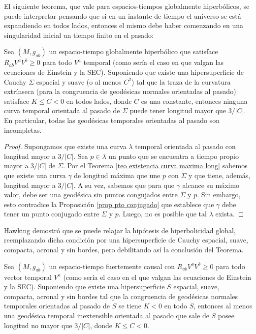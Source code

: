 El siguiente teorema, que vale para espacios-tiempos globalmente hiperbólicos, se puede interpretar pensando que si en un instante de tiempo el universo se está expandiendo en todos lados, entonces el mismo debe haber comenzando en una singularidad inicial un tiempo finito en el pasado:  

    
\begin{theorem}
Sea $(M,g_{ab})$ un espacio-tiempo globalmente hiperbólico que satisface $R_{ab}V^aV^b \geq 0$ para todo $V^a$ temporal (como sería el caso en que valgan las ecuaciones de Einstein y la SEC). Suponiendo que existe una hipersuperficie de Cauchy $\Sigma$ espacial y suave (o al menos $C^2$) tal que la traza de la curvatura extrínseca (para la congruencia de geodésicas normales orientadas al pasado) satisface $K\leq C < 0$ en todos lados, donde $C$ es una constante, entonces ninguna curva temporal orientada al pasado de $\Sigma$ puede tener longitud mayor que $3/|C|$. En particular, todas las geodésicas temporales orientadas al pasado son incompletas.
\end{theorem}
\begin{proof}
Supongamos que existe una curva $\lambda$ temporal orientada al pasado con longitud mayor a $3/|C|$. Sea $p\in\lambda$ un punto que se encuentra a tiempo propio mayor a $3/|C|$ de $\Sigma$. Por el Teorema \ref{teo existencia curva maxima long} sabemos que existe una curva $\gamma$ de longitud máxima que une $p$ con $\Sigma$ y que tiene, además, longitud mayor a $3/|C|$. A su vez, sabemos que para que $\gamma$ alcance su máximo valor, debe ser una geodésica sin puntos congujados entre $\Sigma$ y $p$. Sin embargo, esto contradice la Proposición \ref{prop pto conjugado} que establece que $\gamma$ debe tener un punto conjugado entre $\Sigma$ y $p$. Luego, no es posible que tal $\lambda$ exista.   
\end{proof}


Hawking demostró \citep{Hawking} que se puede relajar la hipótesis de hiperbolicidad global, reemplazando dicha condición por una hipersuperficie de Cauchy espacial, suave, compacta, acronal y sin bordes, pero debilitando así la conclusión del Teorema.

\begin{theorem}\label{temp fuertemente causal}
Sea $(M,g_{ab})$ un espacio-tiempo fuertemente causal con $R_{ab}V^aV^b\geq0$ para todo vector temporal $V^a$ (como sería el caso en el que valgan las ecuaciones de Einstein y la SEC). Suponiendo que existe una hipersuperficie $S$ espacial, suave, compacta, acronal y sin bordes tal que la congruencia de geodésicas normales temporales orientadas al pasado de $S$ se tiene $K<0$ en todo $S$, entonces al menos una geodésica temporal inextensible orientada al pasado que sale de $S$ posee longitud no mayor que $3/|C|$, donde $K\leq C<0$.
\end{theorem}

